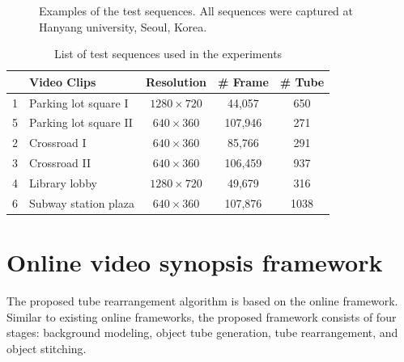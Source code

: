 \documentclass[11pt]{hyu_thesis}
\begin{document}
\begin{figure}
\label{fig:parking_lot}
\label{fig:subway_entrance}
\caption{Examples of the test sequences. All sequences were captured at Hanyang university, Seoul, Korea.}
\label{fig:examples}
\end{figure}

\begin{table}
\small
\begin{center}
\begin{tabular}{c|l|c|c|c|}
\cline{2-5}
 & Video Clips & Resolution & \# Frame & \# Tube\\
\hline
\multicolumn{1}{|c|}{1} & Parking lot square I & $1280 \times 720$ & 44,057 & 650\\
\hline
\multicolumn{1}{|c|}{5} & Parking lot square II & $640 \times 360$ & 107,946 & 271\\
\hline
\multicolumn{1}{|c|}{2} & Crossroad I & $640 \times 360$ & 85,766 & 291\\
\hline
\multicolumn{1}{|c|}{3} & Crossroad II & $640 \times 360$ & 106,459 & 937\\
\hline
\multicolumn{1}{|c|}{4} & Library lobby & $1280 \times 720$ & 49,679 & 316\\
\hline
\multicolumn{1}{|c|}{6} & Subway station plaza & $640 \times 360$ & 107,876 & 1038\\
\hline
\end{tabular}
\end{center}
\caption{List of test sequences used in the experiments}
\label{tb:video_list}
\end{table}

\section{Online video synopsis framework}
\label{sec:framework}
The proposed tube rearrangement algorithm is based on the online framework. Similar to existing online frameworks, the proposed framework consists of four stages: background modeling, object tube generation, tube rearrangement, and object stitching. 
\end{document}
